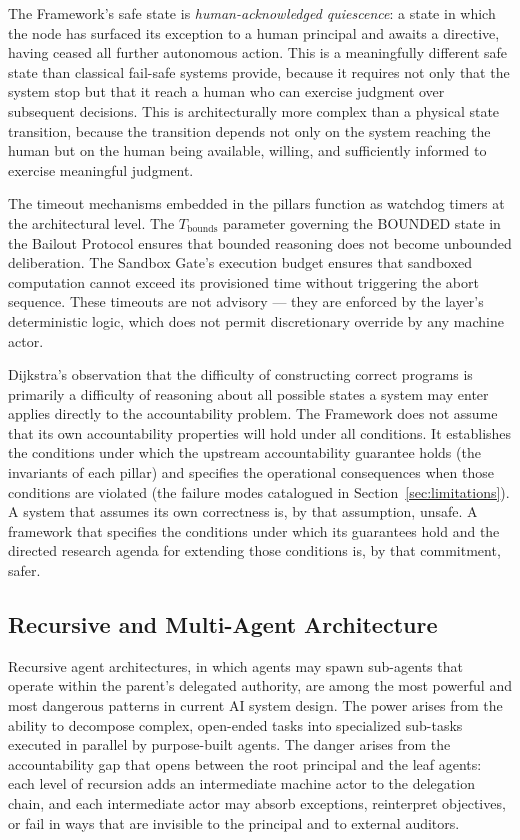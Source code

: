 The \bxthree{} Framework's safe state is \textit{human-acknowledged quiescence}: a state in which the node has surfaced its exception to a human principal and awaits a directive, having ceased all further autonomous action. This is a meaningfully different safe state than classical fail-safe systems provide, because it requires not only that the system stop but that it reach a human who can exercise judgment over subsequent decisions. This is architecturally more complex than a physical state transition, because the transition depends not only on the system reaching the human but on the human being available, willing, and sufficiently informed to exercise meaningful judgment.

The timeout mechanisms embedded in the \bxthree{} pillars function as watchdog timers at the architectural level. The $T_{\text{bounds}}$ parameter governing the BOUNDED state in the Bailout Protocol ensures that bounded reasoning does not become unbounded deliberation. The Sandbox Gate's execution budget ensures that sandboxed computation cannot exceed its provisioned time without triggering the abort sequence. These timeouts are not advisory --- they are enforced by the \fact{} layer's deterministic logic, which does not permit discretionary override by any machine actor.

Dijkstra's observation that the difficulty of constructing correct programs is primarily a difficulty of reasoning about all possible states a system may enter~\cite{dijkstra1982} applies directly to the \bxthree{} accountability problem. The \bxthree{} Framework does not assume that its own accountability properties will hold under all conditions. It establishes the conditions under which the upstream accountability guarantee holds (the invariants of each pillar) and specifies the operational consequences when those conditions are violated (the failure modes catalogued in Section~\ref{sec:limitations}). A system that assumes its own correctness is, by that assumption, unsafe. A framework that specifies the conditions under which its guarantees hold and the directed research agenda for extending those conditions is, by that commitment, safer.

\subsection{Recursive and Multi-Agent Architecture}

Recursive agent architectures, in which agents may spawn sub-agents that operate within the parent's delegated authority, are among the most powerful and most dangerous patterns in current AI system design. The power arises from the ability to decompose complex, open-ended tasks into specialized sub-tasks executed in parallel by purpose-built agents. The danger arises from the accountability gap that opens between the root principal and the leaf agents: each level of recursion adds an intermediate machine actor to the delegation chain, and each intermediate actor may absorb exceptions, reinterpret objectives, or fail in ways that are invisible to the principal and to external auditors.

